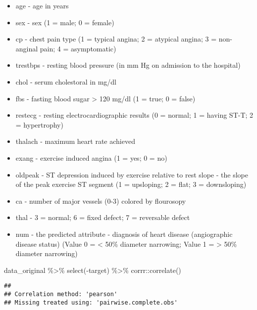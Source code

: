 \documentclass[
]{book}
\newenvironment{Shaded}{\begin{snugshade}}{\end{snugshade}}
\newcommand{\FunctionTok}[1]{\textcolor[rgb]{0.00,0.00,0.00}{#1}}
\newcommand{\NormalTok}[1]{#1}
\newcommand{\SpecialCharTok}[1]{\textcolor[rgb]{0.00,0.00,0.00}{#1}}
\providecommand{\tightlist}{%
  \setlength{\itemsep}{0pt}\setlength{\parskip}{0pt}}
\begin{document}
\begin{itemize}
\tightlist
\item
  age - age in years
\item
  sex - sex (1 = male; 0 = female)
\item
  cp - chest pain type (1 = typical angina; 2 = atypical angina; 3 = non-anginal pain; 4 = asymptomatic)
\item
  trestbps - resting blood pressure (in mm Hg on admission to the hospital)
\item
  chol - serum cholestoral in mg/dl
\item
  fbs - fasting blood sugar \textgreater{} 120 mg/dl (1 = true; 0 = false)
\item
  restecg - resting electrocardiographic results (0 = normal; 1 = having ST-T; 2 = hypertrophy)
\item
  thalach - maximum heart rate achieved
\item
  exang - exercise induced angina (1 = yes; 0 = no)
\item
  oldpeak - ST depression induced by exercise relative to rest
  slope - the slope of the peak exercise ST segment (1 = upsloping; 2 = flat; 3 = downsloping)
\item
  ca - number of major vessels (0-3) colored by flourosopy
\item
  thal - 3 = normal; 6 = fixed defect; 7 = reversable defect
\item
  num - the predicted attribute - diagnosis of heart disease (angiographic disease status) (Value 0 = \textless{} 50\% diameter narrowing; Value 1 = \textgreater{} 50\% diameter narrowing)
\end{itemize}

\begin{Shaded}
\begin{Highlighting}[]
\NormalTok{data\_original }\SpecialCharTok{\%\textgreater{}\%}
  \FunctionTok{select}\NormalTok{(}\SpecialCharTok{{-}}\NormalTok{target) }\SpecialCharTok{\%\textgreater{}\%}
\NormalTok{  corrr}\SpecialCharTok{::}\FunctionTok{correlate}\NormalTok{()}
\end{Highlighting}
\end{Shaded}

\begin{verbatim}
## 
## Correlation method: 'pearson'
## Missing treated using: 'pairwise.complete.obs'
\end{verbatim}
\end{document}
